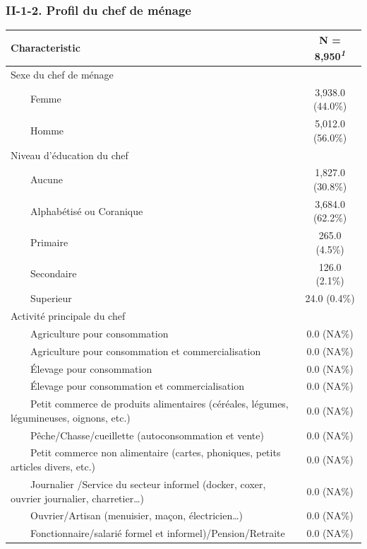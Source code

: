 \documentclass[
]{article}
\begin{document}
\hypertarget{ii-1-2.-profil-du-chef-de-muxe9nage}{%
\subsubsection{II-1-2. Profil du chef de
ménage}\label{ii-1-2.-profil-du-chef-de-muxe9nage}}

\begin{table}[!t]
\fontsize{9.8pt}{11.7pt}\selectfont
\begin{tabular*}{\linewidth}{@{\extracolsep{\fill}}lc}
\toprule
\textbf{Characteristic} & \textbf{N = 8,950}\textsuperscript{\textit{1}} \\ 
\midrule\addlinespace[2.5pt]
Sexe du chef de ménage &  \\ 
    Femme & 3,938.0 (44.0\%) \\ 
    Homme & 5,012.0 (56.0\%) \\ 
Niveau d'éducation du chef &  \\ 
    Aucune & 1,827.0 (30.8\%) \\ 
    Alphabétisé ou Coranique & 3,684.0 (62.2\%) \\ 
    Primaire & 265.0 (4.5\%) \\ 
    Secondaire & 126.0 (2.1\%) \\ 
    Superieur & 24.0 (0.4\%) \\ 
Activité principale du chef &  \\ 
    Agriculture pour consommation & 0.0 (NA\%) \\ 
    Agriculture pour consommation et commercialisation & 0.0 (NA\%) \\ 
    Élevage pour consommation & 0.0 (NA\%) \\ 
    Élevage pour consommation et commercialisation & 0.0 (NA\%) \\ 
    Petit commerce de produits alimentaires (céréales, légumes, légumineuses, oignons, etc.) & 0.0 (NA\%) \\ 
    Pêche/Chasse/cueillette (autoconsommation et vente) & 0.0 (NA\%) \\ 
    Petit commerce non alimentaire (cartes, phoniques, petits articles divers, etc.) & 0.0 (NA\%) \\ 
    Journalier /Service du secteur informel (docker, coxer, ouvrier journalier, charretier…) & 0.0 (NA\%) \\ 
    Ouvrier/Artisan (menuisier, maçon, électricien…) & 0.0 (NA\%) \\ 
    Fonctionnaire/salarié formel et informel)/Pension/Retraite & 0.0 (NA\%) \\ 

\end{tabular*}
\end{table}
\end{document}
